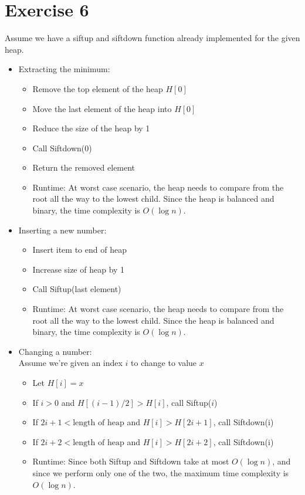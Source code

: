 \documentclass[11pt]{article}
\begin{document}
\section*{Exercise 6}
Assume we have a siftup and siftdown function already implemented for the given heap.
\begin{itemize}
\item Extracting the minimum:
\begin{itemize}
\item Remove the top element of the heap $H[0]$
\item Move the last element of the heap into $H[0]$
\item Reduce the size of the heap by 1
\item Call Siftdown(0)
\item Return the removed element
\item Runtime: At worst case scenario, the heap needs to compare from the root all the way to the lowest child. Since the heap is balanced and binary, the time complexity is $O(\log n)$.
\end{itemize}
\item Inserting a new number:
\begin{itemize}
\item Insert item to end of heap
\item Increase size of heap by 1
\item Call Siftup(last element)
\item Runtime: At worst case scenario, the heap needs to compare from the root all the way to the lowest child. Since the heap is balanced and binary, the time complexity is $O(\log n)$.
\end{itemize}
\item Changing a number: \\ Assume we're given an index $i$ to change to value $x$
\begin{itemize}
\item Let $H[i]=x$
\item If $i>0$ and $H[(i-1)/2]>H[i]$, call Siftup($i$)
\item If $2i+1 < \text{length of heap}$ and $H[i] > H[2i+1]$, call Siftdown(i)
\item If $2i+2 < \text{length of heap}$ and $H[i] > H[2i+2]$, call Siftdown(i)
\item Runtime: Since both Siftup and Siftdown take at most $O(\log n)$, and since we perform only one of the two, the maximum time complexity is  $O(\log n)$.
\end{itemize}
\end{itemize}
\end{document}
